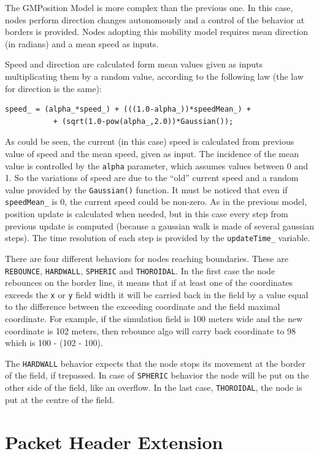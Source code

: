\documentclass[a4paper,10pt]{article}
\begin{document}
The GMPosition Model is more complex than the previous one. In this case, nodes perform direction changes autonomously and a control of the behavior at borders is provided. Nodes adopting this mobility model requires mean direction (in radians) and a mean speed as inputs.

Speed and direction are calculated form mean values given as inputs multiplicating them by a random value, according to the following law (the law for direction is the same):
\begin{verbatim}
speed_ = (alpha_*speed_) + (((1.0-alpha_))*speedMean_) +
           + (sqrt(1.0-pow(alpha_,2.0))*Gaussian());
\end{verbatim}
As could be seen, the current (in this case) speed is calculated from previous value of speed and the mean speed, given as input. The incidence of the mean value is controlled by the \verb=alpha= parameter, which assumes values between 0 and 1. So the variations of speed are due to the ``old'' current speed and a random value provided by the \verb=Gaussian()= function.
It must be noticed that even if \verb=speedMean_= is 0, the current speed could be non-zero.
As in the previous model, position update is calculated when needed, but in this case every step from previous update is computed (because a gaussian walk is made of several gaussian steps). The time resolution of each step is provided by the \verb=updateTime_= variable.

There are four different behaviors for nodes reaching boundaries. These are \verb=REBOUNCE=, \verb=HARDWALL=, \verb=SPHERIC= and \verb=THOROIDAL=. In the first case the node rebounces on the border line, it means that if at least one of the coordinates exceeds the \verb=x= or \verb=y= field width it will be carried back in the field by a value equal to the difference between the exceeding coordinate and the field maximal coordinate. For example, if the simulation field is 100 meters wide and the new coordinate is 102 meters, then rebounce algo will carry back coordinate to 98 which is 100 - (102 - 100).

The \verb=HARDWALL= behavior expects that the node stops its movement at the border of the field, if trepassed. In case of \verb=SPHERIC= behavior the node will be put on the other side of the field, like an overflow. In the last case, \verb=THOROIDAL=, the node is put at the centre of the field.


\section{Packet Header Extension}
\end{document}
